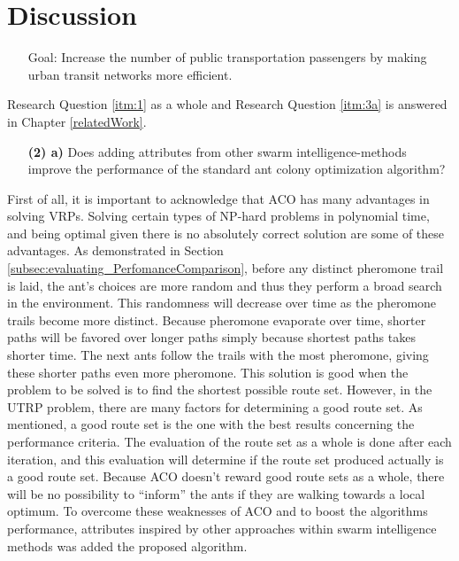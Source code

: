 \section{Discussion}
\begin{itemize}
\item[Goal:]  Increase the number of public transportation passengers by making urban transit networks more efficient.
\end{itemize}
Research Question \vref{itm:1} as a whole and Research Question \vref{itm:3a} is answered in Chapter \vref{relatedWork}.

\begin{itemize}
\item[\textbf{(2) a)}] Does adding attributes from other swarm intelligence-methods improve the performance of the standard ant colony optimization algorithm?
\end{itemize}

First of all, it is important to acknowledge that ACO has many advantages in solving VRPs. Solving certain types of NP-hard problems in polynomial time, and being optimal given there is no absolutely correct solution are some of these advantages. As demonstrated in Section \vref{subsec:evaluating_PerfomanceComparison}, before any distinct pheromone trail is laid, the ant's choices are more random and thus they perform a broad search in the environment. This randomness will decrease over time as the pheromone trails become more distinct. Because pheromone evaporate over time, shorter paths will be favored over longer paths simply because shortest paths takes shorter time. The next ants follow the trails with the most pheromone, giving these shorter paths even more pheromone. This solution is good when the problem to be solved is to find the shortest possible route set. However, in the UTRP problem, there are many factors for determining a good route set. As mentioned, a good route set is the one with the best results concerning the performance criteria. The evaluation of the route set as a whole is done after each iteration, and this evaluation will determine if the route set produced actually is a good route set. Because ACO doesn't reward good route sets as a whole, there will be no possibility to ``inform'' the ants if they are walking towards a local optimum. To overcome these weaknesses of ACO and to boost the algorithms performance, attributes inspired by other approaches within swarm intelligence methods was added the proposed algorithm. 


